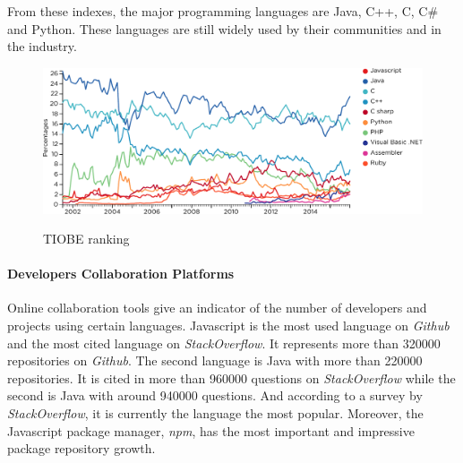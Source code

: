 From these indexes, the major programming languages are Java, C++, C, C\# and Python.
These languages are still widely used by their communities and in the industry.


\begin{figure}
  \centering
  \includegraphics[width=\linewidth]{../resources/tiobe.pdf}
  \label{fig:tiobe}
  \caption{TIOBE ranking}
\end{figure}

\paragraph{Developers Collaboration Platforms}

Online collaboration tools give an indicator of the number of developers and projects using certain languages.
Javascript is the most used language on \textit{Github} and the most cited language on \textit{StackOverflow}.
It represents more than \num{320000} repositories on \textit{Github}.
The second language is Java with more than \num{220000} repositories.
It is cited in more than \num{960000} questions on \textit{StackOverflow} while the second is Java with around \num{940000} questions.
And according to a survey by \textit{StackOverflow}, it is currently the language the most popular.
Moreover, the Javascript package manager, \textit{npm}, has the most important and impressive package repository growth.

